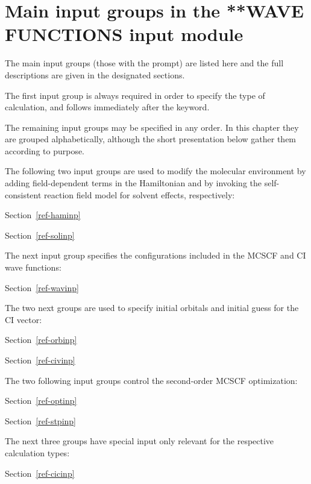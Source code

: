 \pagebreak[3]
\section{\label{sec:ref-newinp}
   Main input groups in the **WAVE FUNCTIONS input module}

\noindent
The main input groups (those with the {\starkey} prompt) are listed here and
the full descriptions are given in the designated sections.

\noindent
The first input group is always required in order to specify the type of
calculation, and follows immediately after the 
keyword.


\noindent The remaining input groups may be specified in any
order. In this chapter they are grouped alphabetically, although
the short presentation below gather them according to purpose.

The following two input groups are used to modify the
molecular environment by adding field-dependent
terms in the Hamiltonian and by invoking
the self-consistent reaction field model for solvent
effects, respectively:

Section~\ref{ref-haminp} 

Section~\ref{ref-solinp} 
%

\noindent
The next input group specifies the configurations included
in the MCSCF and CI wave functions:

Section~\ref{ref-wavinp} 

\noindent
The two next groups are used to specify initial orbitals and initial
guess for the CI vector:

Section~\ref{ref-orbinp} 

Section~\ref{ref-civinp} 

\noindent
The two following input groups control the second-order MCSCF
optimization:

Section~\ref{ref-optinp} 

Section~\ref{ref-stpinp} 

\noindent
The next three groups have special input only relevant for the
respective calculation types:

Section~\ref{ref-cicinp} 

